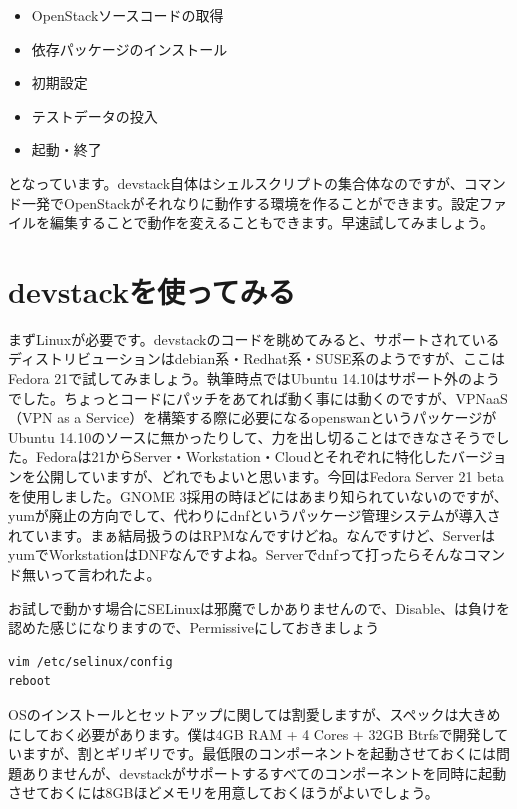 \documentclass[8pt,b5paper,tombo,openany]{jsbook}
\begin{document}
\begin{itemize}
  \item OpenStackソースコードの取得
  \item 依存パッケージのインストール
  \item 初期設定
  \item テストデータの投入
  \item 起動・終了
\end{itemize}

となっています。devstack自体はシェルスクリプトの集合体なのですが、コマンド一発でOpenStackがそれなりに動作する環境を作ることができます。設定ファイルを編集することで動作を変えることもできます。早速試してみましょう。

\section{devstackを使ってみる}

まずLinuxが必要です。devstackのコードを眺めてみると、サポートされているディストリビューションはdebian系・Redhat系・SUSE系のようですが、ここはFedora 21で試してみましょう。執筆時点ではUbuntu 14.10はサポート外のようでした。ちょっとコードにパッチをあてれば動く事には動くのですが、VPNaaS（VPN as a Service）を構築する際に必要になるopenswanというパッケージがUbuntu 14.10のソースに無かったりして、力を出し切ることはできなさそうでした。Fedoraは21からServer・Workstation・Cloudとそれぞれに特化したバージョンを公開していますが、どれでもよいと思います。今回はFedora Server 21 betaを使用しました。GNOME 3採用の時ほどにはあまり知られていないのですが、yumが廃止の方向でして、代わりにdnfというパッケージ管理システムが導入されています。まぁ結局扱うのはRPMなんですけどね。なんですけど、ServerはyumでWorkstationはDNFなんですよね。Serverでdnfって打ったらそんなコマンド無いって言われたよ。

お試しで動かす場合にSELinuxは邪魔でしかありませんので、Disable、は負けを認めた感じになりますので、Permissiveにしておきましょう

\begin{lstlisting}
vim /etc/selinux/config
reboot
\end{lstlisting}

OSのインストールとセットアップに関しては割愛しますが、スペックは大きめにしておく必要があります。僕は4GB RAM + 4 Cores + 32GB Btrfsで開発していますが、割とギリギリです。最低限のコンポーネントを起動させておくには問題ありませんが、devstackがサポートするすべてのコンポーネントを同時に起動させておくには8GBほどメモリを用意しておくほうがよいでしょう。
\end{document}
